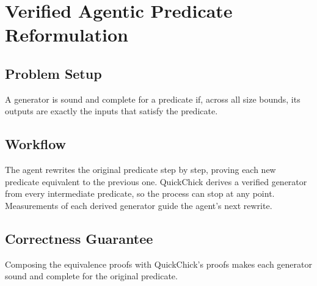\section{Verified Agentic Predicate Reformulation}
\label{sec:scaling}

\subsection{Problem Setup}
\label{sec:problem-setup}

A generator is sound and complete for a predicate if, across all size bounds,
its outputs are exactly the inputs that satisfy the predicate.

\subsection{Workflow}
\label{sec:workflow}

The agent rewrites the original predicate step by step, proving each new
predicate equivalent to the previous one.
QuickChick derives a verified generator from every intermediate predicate, so
the process can stop at any point.
Measurements of each derived generator guide the agent's next rewrite.

\subsection{Correctness Guarantee}
\label{sec:guarantee}

Composing the equivalence proofs with QuickChick's proofs makes each generator
sound and complete for the original predicate.

